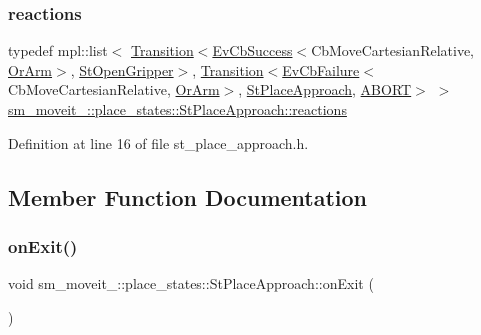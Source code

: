 \subsubsection{\texorpdfstring{reactions}{reactions}}
{\footnotesize\ttfamily typedef mpl\+::list$<$ \hyperlink{classsmacc_1_1Transition}{Transition}$<$\hyperlink{structsmacc_1_1EvCbSuccess}{Ev\+Cb\+Success}$<$Cb\+Move\+Cartesian\+Relative, \hyperlink{classsm__moveit__4_1_1OrArm}{Or\+Arm}$>$, \hyperlink{structsm__moveit__4_1_1place__states_1_1StOpenGripper}{St\+Open\+Gripper}$>$, \hyperlink{classsmacc_1_1Transition}{Transition}$<$\hyperlink{structsmacc_1_1EvCbFailure}{Ev\+Cb\+Failure}$<$Cb\+Move\+Cartesian\+Relative, \hyperlink{classsm__moveit__4_1_1OrArm}{Or\+Arm}$>$, \hyperlink{structsm__moveit__4_1_1place__states_1_1StPlaceApproach}{St\+Place\+Approach}, \hyperlink{structsmacc_1_1default__transition__tags_1_1ABORT}{A\+B\+O\+RT}$>$ $>$ \hyperlink{structsm__moveit__4_1_1place__states_1_1StPlaceApproach_a700162e35faa9c26389e84dbc82b5a89}{sm\+\_\+moveit\+\_\+::place\+\_\+states\+::\+St\+Place\+Approach\+::reactions}}



Definition at line 16 of file st\+\_\+place\+\_\+approach.\+h.



\subsection{Member Function Documentation}
\mbox{\label{structsm__moveit__4_1_1place__states_1_1StPlaceApproach_a48540a31af65f96b2a58aeacbab98d15}} 
\subsubsection{\texorpdfstring{on\+Exit()}{onExit()}}
{\footnotesize\ttfamily void sm\+\_\+moveit\+\_\+::place\+\_\+states\+::\+St\+Place\+Approach\+::on\+Exit (\begin{DoxyParamCaption}{ }\end{DoxyParamCaption})\hspace{0.3cm}{\ttfamily [inline]}}



